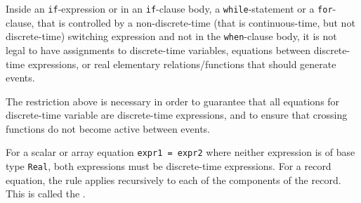 Inside an \lstinline!if!-expression or in an \lstinline!if!-clause body, a \lstinline!while!-statement or a \lstinline!for!-clause, that is controlled by a non-discrete-time (that is continuous-time, but not discrete-time) switching expression and not in the \lstinline!when!-clause body, it is not legal to have assignments to discrete-time variables, equations between discrete-time expressions, or real elementary relations/functions that should generate events.

\begin{nonnormative}
The restriction above is necessary in order to guarantee that all equations for discrete-time variable are discrete-time expressions, and to ensure that crossing functions do not become active between events.
\end{nonnormative}

For a scalar or array equation \lstinline!expr1 = expr2! where neither expression is of base type \lstinline!Real!, both expressions must be discrete-time expressions.
For a record equation, the rule applies recursively to each of the components of the record.
This is called the .

